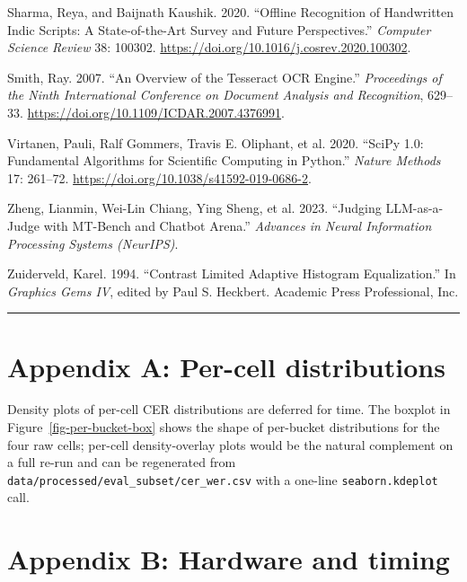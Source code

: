 \documentclass[
  letterpaper,
  DIV=11,
  numbers=noendperiod]{scrartcl}
\newlength{\cslhangindent}
\newenvironment{CSLReferences}[2] %
 {\begin{list}{}{%
  \setlength{\itemindent}{0pt}
  \setlength{\leftmargin}{0pt}
  \setlength{\parsep}{0pt}
  \ifodd #1
   \setlength{\leftmargin}{\cslhangindent}
   \setlength{\itemindent}{-1\cslhangindent}
  \fi
  \setlength{\itemsep}{#2\baselineskip}}}
 {\end{list}}
\begin{document}
\begin{CSLReferences}{1}{1}
Sharma, Reya, and Baijnath Kaushik. 2020. {``Offline Recognition of
Handwritten {Indic} Scripts: A State-of-the-Art Survey and Future
Perspectives.''} \emph{Computer Science Review} 38: 100302.
\url{https://doi.org/10.1016/j.cosrev.2020.100302}.

Smith, Ray. 2007. {``An Overview of the {Tesseract} {OCR} Engine.''}
\emph{Proceedings of the Ninth International Conference on Document
Analysis and Recognition}, 629--33.
\url{https://doi.org/10.1109/ICDAR.2007.4376991}.

{Virtanen, Pauli, Ralf Gommers, Travis E. Oliphant, et al.} 2020.
{``{SciPy} 1.0: Fundamental Algorithms for Scientific Computing in
{Python}.''} \emph{Nature Methods} 17: 261--72.
\url{https://doi.org/10.1038/s41592-019-0686-2}.

Zheng, Lianmin, Wei-Lin Chiang, Ying Sheng, et al. 2023. {``Judging
{LLM}-as-a-Judge with {MT}-Bench and {Chatbot Arena}.''} \emph{Advances
in Neural Information Processing Systems (NeurIPS)}.

Zuiderveld, Karel. 1994. {``Contrast Limited Adaptive Histogram
Equalization.''} In \emph{Graphics Gems IV}, edited by Paul S. Heckbert.
Academic Press Professional, Inc.

\end{CSLReferences}

\begin{center}\rule{0.5\linewidth}{0.5pt}\end{center}

\section*{Appendix A: Per-cell
distributions}\label{appendix-a-per-cell-distributions}

Density plots of per-cell CER distributions are deferred for time. The
boxplot in Figure~\ref{fig-per-bucket-box} shows the shape of per-bucket
distributions for the four raw cells; per-cell density-overlay plots
would be the natural complement on a full re-run and can be regenerated
from \texttt{data/processed/eval\_subset/cer\_wer.csv} with a one-line
\texttt{seaborn.kdeplot} call.

\section*{Appendix B: Hardware and
timing}\label{appendix-b-hardware-and-timing}
\end{document}
